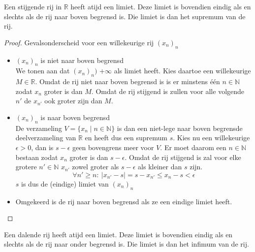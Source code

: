 \documentclass[main.tex]{subfiles}
\begin{document}
\begin{st}
  \label{st:stijgend-dan-limiet}
  Een stijgende rij in $\mathbb{R}$ heeft atijd een limiet.
  Deze limiet is bovendien eindig als en slechts als de rij naar boven begrensd is.
  Die limiet is dan het supremum van de rij.

  \begin{proof}
    Gevalsonderscheid voor een willekeurige rij $(x_{n})_{n}$
    \begin{itemize}
    \item $(x_{n})_{n}$ is niet naar boven begrensd\\
      We tonen aan dat $(x_{n})_{n})$ $+\infty$ als limiet heeft.
      Kies daartoe een willekeurige $M\in\mathbb{R}$.
      Omdat de rij niet naar boven begrensd is is er minstens \'e\'en $n\in \mathbb{N}$ zodat $x_{n}$ groter is dan $M$.
      Omdat de rij stijgend is zullen voor alle volgende $n'$ de $x_{n'}$ ook groter zijn dan $M$.
    \item $(x_{n})_{n}$ is naar boven begrensd\\
      De verzameling $V = \{x_{n}\mid n\in \mathbb{N}\}$ is dan een niet-lege naar boven begrensde deelverzameling van $\mathbb{R}$ en heeft dus een supremum $s$.
      Kies nu een willekeurige $\epsilon > 0$, dan is $s-\epsilon$ geen bovengrens meer voor $V$.
      Er moet daarom een $n\in \mathbb{N}$ bestaan zodat $x_{n}$ groter is dan $s-\epsilon$.
      Omdat de rij stijgend is zal voor elke grotere $n'\in \mathbb{N}$ $x_{n'}$ zowel groter als $s-\epsilon$ als kleiner dan $s$ zijn.
      \[ \forall n' \ge n:\ |x_{n'}-s| = s-x_{n'} \le x_{n}-s < \epsilon \]
      $s$ is dus de (eindige) limiet van $(x_{n})_{n}$
    \item Omgekeerd is de rij naar boven begrensd als ze een eindige limiet heeft.
    \end{itemize}
  \end{proof}
\end{st}

\begin{st}
  \label{st:dalend-dan-limiet}
  Een dalende rij heeft atijd een limiet.
  Deze limiet is bovendien eindig als en slechts als de rij naar onder begrensd is.
  Die limiet is dan het infimum van de rij.
\end{st}
\end{document}
